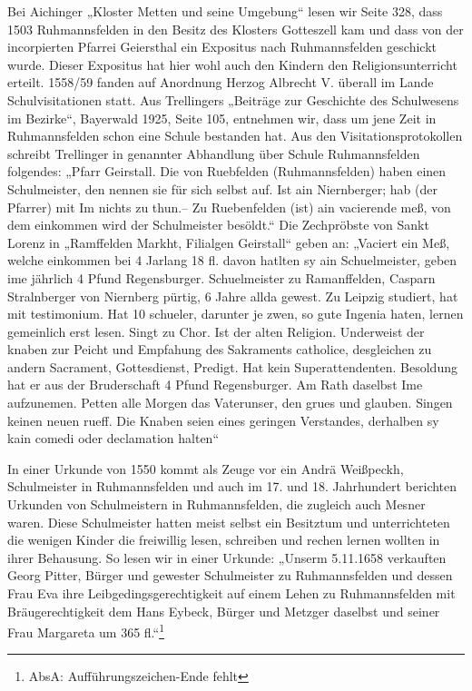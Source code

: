 \documentclass[12pt,a4paper]{book}
\begin{document}
Bei Aichinger „Kloster Metten und seine Umgebung“ lesen wir Seite 328, dass 1503
Ruhmannsfelden in den Besitz des Klosters Gotteszell kam und dass von der
incorpierten Pfarrei Geiersthal ein Expositus nach Ruhmannsfelden geschickt
wurde. Dieser Expositus hat hier wohl auch den Kindern den Religionsunterricht
erteilt. 1558/59 fanden auf Anordnung Herzog Albrecht V. überall im Lande
Schulvisitationen statt. Aus Trellingers „Beiträge zur Geschichte des
Schulwesens im Bezirke“, Bayerwald 1925, Seite 105, entnehmen wir, dass um jene
Zeit in Ruhmannsfelden schon eine Schule bestanden hat. Aus den
Visitationsprotokollen schreibt Trellinger in genannter Abhandlung über Schule
Ruhmannsfelden folgendes: „Pfarr Geirstall. Die von Ruebfelden (Ruhmannsfelden)
haben einen Schulmeister, den nennen sie für sich selbst auf. Ist ain
Niernberger; hab (der Pfarrer) mit Im nichts zu thun.--  Zu Ruebenfelden (ist)
ain vacierende meß, von dem einkommen wird der Schulmeister besöldt.“ Die
Zechpröbste von Sankt Lorenz in „Ramffelden Markht, Filialgen Geirstall“ geben
an: „Vaciert ein Meß, welche einkommen bei 4 Jarlang 18 fl. davon hatlten sy ain
Schuelmeister, geben ime jährlich 4 Pfund Regensburger. Schuelmeister zu
Ramanffelden, Casparn Stralnberger von Niernberg pürtig, 6 Jahre allda gewest.
Zu Leipzig studiert, hat mit testimonium. Hat 10 schueler, darunter je zwen, so
gute Ingenia haten, lernen gemeinlich erst lesen. Singt zu Chor. Ist der alten
Religion. Underweist der knaben zur Peicht und Empfahung des Sakraments
catholice, desgleichen zu andern Sacrament, Gottesdienst, Predigt. Hat kein
Superattendenten. Besoldung hat er aus der Bruderschaft 4 Pfund Regensburger. Am
Rath daselbst Ime aufzunemen. Petten alle Morgen das Vaterunser, den grues und
glauben. Singen keinen neuen rueff. Die Knaben seien eines geringen Verstandes,
derhalben sy kain comedi oder declamation halten“

In einer Urkunde von 1550 kommt als Zeuge vor ein Andrä Weißpeckh, Schulmeister
in Ruhmannsfelden und auch im 17. und 18. Jahrhundert berichten Urkunden von
Schulmeistern in Ruhmannsfelden, die zugleich auch Mesner waren. Diese
Schulmeister hatten meist selbst ein Besitztum und unterrichteten die wenigen
Kinder die freiwillig lesen, schreiben und rechen lernen wollten in ihrer
Behausung. So lesen wir in einer Urkunde: „Unserm 5.11.1658 verkauften Georg
Pitter, Bürger und gewester Schulmeister zu Ruhmannsfelden und dessen Frau Eva
ihre Leibgedingsgerechtigkeit auf einem Lehen zu Ruhmannsfelden mit
Bräugerechtigkeit dem Hans Eybeck, Bürger und Metzger daselbst und seiner Frau
Margareta um 365 fl.“\footnote{AbsA: Aufführungszeichen-Ende fehlt}
\end{document}
